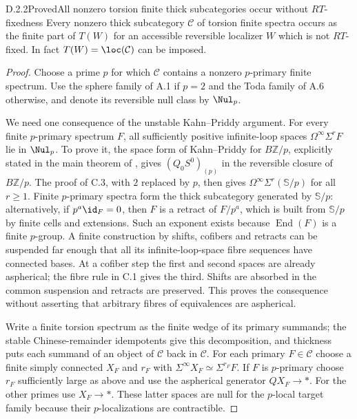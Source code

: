 \begin{claim}{D.2.2}{Proved}{All nonzero torsion finite thick subcategories occur without $RT$-fixedness}
Every nonzero thick subcategory $\mathcal C$ of torsion finite spectra occurs as the finite part of $T(W)$ for an accessible reversible localizer $W$ which is not $RT$-fixed. In fact $T(W)=\loc(\mathcal C)$ can be imposed.
\end{claim}
\begin{proof}
Choose a prime $p$ for which $\mathcal C$ contains a nonzero $p$-primary finite spectrum. Use the sphere family of A.1 if $p=2$ and the Toda family of A.6 otherwise, and denote its reversible null class by $\Nul_p$.

We need one consequence of the unstable Kahn--Priddy argument. For every finite $p$-primary spectrum $F$, all sufficiently positive infinite-loop spaces $\Omega^\infty\Sigma^rF$ lie in $\Nul_p$. To prove it, the space form of Kahn--Priddy for $B\mathbb Z/p$, explicitly stated in the main theorem of \citet[p.~103]{KahnPriddy1978}, gives $(Q_0S^0)_{(p)}$ in the reversible closure of $B\mathbb Z/p$. The proof of C.3, with $2$ replaced by $p$, then gives $\Omega^\infty\Sigma^r(\mathbb S/p)$ for all $r\geq1$. Finite $p$-primary spectra form the thick subcategory generated by $\mathbb S/p$: alternatively, if $p^a\id_F=0$, then $F$ is a retract of $F/p^a$, which is built from $\mathbb S/p$ by finite cells and extensions. Such an exponent exists because $\operatorname{End}(F)$ is a finite $p$-group. A finite construction by shifts, cofibers and retracts can be suspended far enough that all its infinite-loop-space fibre sequences have connected bases. At a cofiber step the first and second spaces are already aspherical; the fibre rule in C.1 gives the third. Shifts are absorbed in the common suspension and retracts are preserved. This proves the consequence without asserting that arbitrary fibres of equivalences are aspherical.

Write a finite torsion spectrum as the finite wedge of its primary summands; the stable Chinese-remainder idempotents give this decomposition, and thickness puts each summand of an object of $\mathcal C$ back in $\mathcal C$. For each primary $F\in\mathcal C$ choose a finite simply connected $X_F$ and $r_F$ with $\Sigma^\infty X_F\simeq\Sigma^{r_F}F$. If $F$ is $p$-primary choose $r_F$ sufficiently large as above and use the aspherical generator $QX_F\to *$. For the other primes use $X_F\to *$. These latter spaces are null for the $p$-local target family because their $p$-localizations are contractible.


\end{proof}

